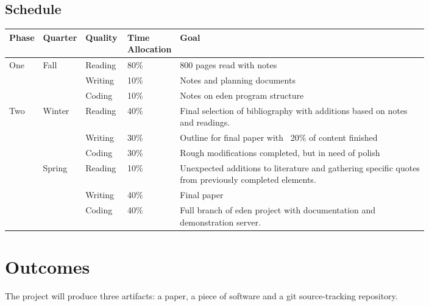 \documentclass[a4paper,man,natbib]{apa6}
\begin{document}
   \subsection*{Schedule}
   \begin{center}
   \begin{tabular}{|l|l|p{0.1\linewidth}|p{0.1\linewidth}|p{0.6\linewidth}|}
   \hline
   Phase & Quarter & Quality & Time Allocation & Goal                         \\ \hline
   One   & Fall    & Reading & 80\%            & 800 pages read with notes    \\ \cline{3-5} 
         &         & Writing & 10\%            & Notes and planning documents \\ \cline{3-5} 
         &         & Coding  & 10\%            & Notes on \acrshort{eden} program structure   \\ \hline 
   Two   & Winter  & Reading & 40\%            & Final selection of bibliography with additions based on notes and readings.   \\ \cline{3-5} 
         &         & Writing & 30\%            & Outline for final paper with ~20\% of content finished \\ \cline{3-5} 
         &         & Coding  & 30\%            & Rough modifications completed, but in need of polish  \\ \cline{2-5}
         & Spring  & Reading & 10\%            & Unexpected additions to literature and gathering specific quotes from previously completed elements.   \\ \cline{3-5} 
         &         & Writing & 40\%            & Final paper \\ \cline{3-5}
         &         & Coding  & 40\%            & Full branch of \acrshort{eden} project with documentation and demonstration server. \\ \hline
   \end{tabular}
   \end{center}
   \newpage
   \section*{Outcomes}
   The project will produce three artifacts: a paper, a piece of software and a git source-tracking repository.
\end{document}
